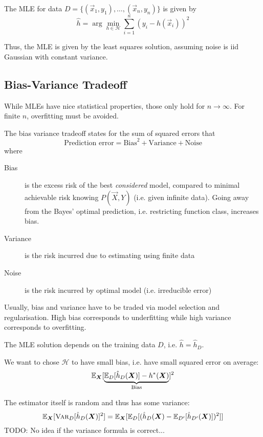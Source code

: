 The MLE for data $D = \{(\vec{x}_1, y_1), \dotsc, (\vec{x}_n, y_n)\}$
is given by
\begin{equation*}
\hat{h} = \arg\min_{h \in \mathcal{H}}{
	\sum_{i=1}^n{(y_i - h(\vec{x}_i))^2}
}
\end{equation*}

Thus, the MLE is given by the least squares
solution, assuming noise is iid Gaussian
with constant variance.


\subsection{Bias-Variance Tradeoff}
While MLEs have nice statistical properties,
those only hold for $n \to \infty$.
For finite $n$, overfitting must be avoided.

The bias variance tradeoff states
for the sum of squared errors that
\begin{equation*}
\text{Prediction error} = \text{Bias}^2 + \text{Variance} + \text{Noise}
\end{equation*}
where
\begin{description}
	\item[Bias] is the excess risk of the best
	\emph{considered} model,
	compared to minimal achievable risk
	knowing $P(\vec{X}, Y)$
	(i.e. given infinite data).
	Going away from the Bayes' optimal
	prediction, i.e. restricting function
	class, increases bias.
	\item[Variance] is the risk incurred
	due to estimating using finite data
	\item[Noise] is the risk incurred by
	optimal model (i.e. irreducible error)
\end{description}

Usually, bias and variance have to be traded
via model selection and regularisation.
High bias corresponds to underfitting
while high variance corresponds to overfitting.

The MLE solution depends on the training data $D$,
i.e. $\hat{h} = \hat{h}_D$.

We want to chose $\mathcal{H}$ to have small bias,
i.e. have small squared error on average:
\begin{equation*}
\mathbb{E}_{\boldsymbol{X}}[
\underbrace{\mathbb{E}_D[\hat{h}_D(\boldsymbol{X})] - h^*(\boldsymbol{X})}_{\text{Bias}}
]^2
\end{equation*}

The estimator itself is random and
thus has some variance:
\begin{equation*}
\mathbb{E}_{\boldsymbol{X}}[\textsc{Var}_D[\hat{h}_D(\boldsymbol{X})]^2]
= \mathbb{E}_{\boldsymbol{X}}[
\mathbb{E}_D[(
\hat{h}_D(\boldsymbol{X}) - \mathbb{E}_{D'}[\hat{h}_{D'}(\boldsymbol{X})]
)^2]
]
\end{equation*}
TODO: No idea if the variance formula is correct...

